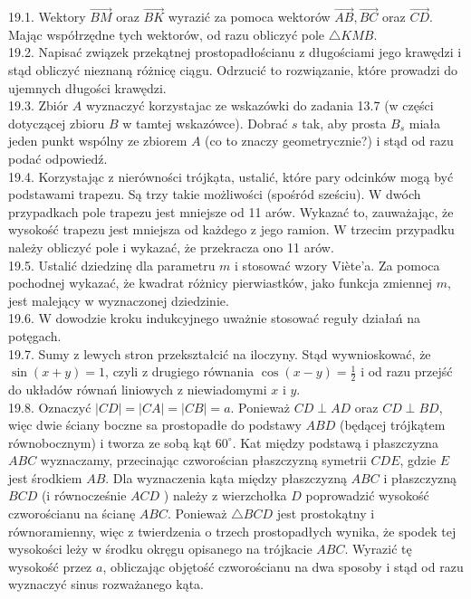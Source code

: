 \documentclass[10pt]{article}
\begin{document}
19.1. Wektory $\overrightarrow{B M}$ oraz $\overrightarrow{B K}$ wyrazić za pomoca wektorów $\overrightarrow{A B}, \overrightarrow{B C}$ oraz $\overrightarrow{C D}$. Mając współrzędne tych wektorów, od razu obliczyć pole $\triangle K M B$.\\
19.2. Napisać związek przekątnej prostopadłościanu z długościami jego krawędzi i stąd obliczyć nieznaną różnicę ciągu. Odrzucić to rozwiązanie, które prowadzi do ujemnych długości krawędzi.\\
19.3. Zbiór $A$ wyznaczyć korzystajac ze wskazówki do zadania 13.7 (w części dotyczącej zbioru $B$ w tamtej wskazówce). Dobrać $s$ tak, aby prosta $B_{s}$ miała jeden punkt wspólny ze zbiorem $A$ (co to znaczy geometrycznie?) i stąd od razu podać odpowiedź.\\
19.4. Korzystając z nierówności trójkạta, ustalić, które pary odcinków mogą być podstawami trapezu. Są trzy takie możliwości (spośród sześciu). W dwóch przypadkach pole trapezu jest mniejsze od 11 arów. Wykazać to, zauważając, że wysokość trapezu jest mniejsza od każdego z jego ramion. W trzecim przypadku należy obliczyć pole i wykazać, że przekracza ono 11 arów.\\
19.5. Ustalić dziedzinę dla parametru $m$ i stosować wzory Viète'a. Za pomoca pochodnej wykazać, że kwadrat różnicy pierwiastków, jako funkcja zmiennej $m$, jest malejący w wyznaczonej dziedzinie.\\
19.6. W dowodzie kroku indukcyjnego uważnie stosować reguły działań na potęgach.\\
19.7. Sumy z lewych stron przekształcić na iloczyny. Stąd wywnioskować, że $\sin (x+y)=1$, czyli z drugiego równania $\cos (x-y)=\frac{1}{2}$ i od razu przejść do układów równań liniowych z niewiadomymi $x$ i $y$.\\
19.8. Oznaczyć $|C D|=|C A|=|C B|=a$. Ponieważ $C D \perp A D$ oraz $C D \perp B D$, więc dwie ściany boczne sa prostopadłe do podstawy $A B D$ (będącej trójkątem równobocznym) i tworza ze sobą kąt $60^{\circ}$. Kat między podstawą i płaszczyzna $A B C$ wyznaczamy, przecinając czworościan płaszczyzną symetrii $C D E$, gdzie $E$ jest środkiem $A B$. Dla wyznaczenia kąta między płaszczyzną $A B C$ i płaszczyzną $B C D$ (i równocześnie $A C D$ ) należy z wierzchołka $D$ poprowadzić wysokość czworościanu na ścianę $A B C$. Ponieważ $\triangle B C D$ jest prostokątny i równoramienny, więc z twierdzenia o trzech prostopadłych wynika, że spodek tej wysokości leży w środku okręgu opisanego na trójkacie $A B C$. Wyrazić tę wysokość przez $a$, obliczając objętość czworościanu na dwa sposoby i stąd od razu wyznaczyć sinus rozważanego kąta.\\
\end{document}
